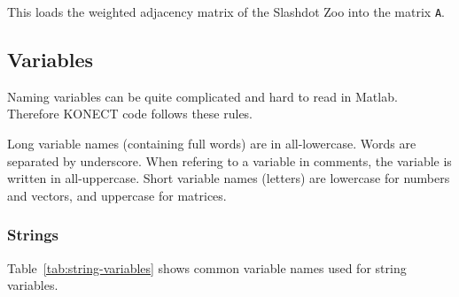 \documentclass{article}
\begin{document}
This loads the weighted adjacency matrix of the Slashdot Zoo into the
matrix \texttt{A}. 

\subsection{Variables}
Naming variables can be quite complicated and hard to read in
Matlab. Therefore KONECT code follows these rules.

Long variable names (containing full words) are in all-lowercase. Words
are separated by underscore.  When refering to a variable in comments,
the variable is written in all-uppercase.  Short variable names
(letters) are lowercase for numbers and vectors, and uppercase for
matrices.

\subsubsection{Strings}
Table~\ref{tab:string-variables} shows common variable names used for
string variables.
\end{document}
